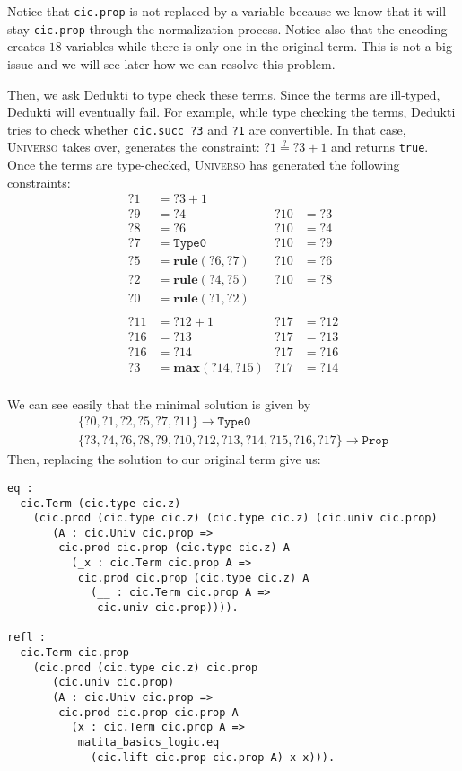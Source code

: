 \documentclass[conference]{IEEEtran}
\newcommand{\universo}{\textsc{Universo}}
\begin{document}
Notice that \texttt{cic.prop} is not replaced by a variable because we know that it will stay \texttt{cic.prop} through the normalization process. Notice also that the encoding creates \(18\) variables while there is only one in the original term. This is not a big issue and we will see later how we can resolve this problem.

Then, we ask Dedukti to type check these terms. Since the terms are ill-typed, Dedukti will eventually fail. For example, while type checking the terms, Dedukti tries to check whether \texttt{cic.succ ?3} and \texttt{?1} are convertible. In that case, \universo{} takes over, generates the constraint: \(?1 \stackrel{?}{=} ?3 + 1\) and returns \texttt{true}. Once the terms are type-checked, \universo{} has generated the following constraints:
\begin{align*}
  ?1 &= ?3 + 1 \\
  ?9 &= ?4     & ?10 &= ?3\\
  ?8 &= ?6     & ?10 &= ?4\\
  ?7 &= \mathtt{Type0} & ?10 &= ?9\\
  ?5 &= \mathbf{rule}(?6,?7)     & ?10 &= ?6\\
  ?2 &= \mathbf{rule}(?4,?5)     & ?10 &= ?8\\
  ?0 &= \mathbf{rule}(?1,?2)\\
  \\
  ?11 &= ?12 + 1 & ?17 &= ?12\\
  ?16 &= ?13 & ?17 &= ?13\\
  ?16 &= ?14 & ?17 &= ?16\\
  ?3 &= \mathbf{max}(?14,?15) & ?17 &= ?14\\
\end{align*}

We can see easily that the minimal solution is given by
\begin{align*}
  \{?0,?1,?2,?5,?7,?11\} \to \mathtt{Type0}\\
  \{?3,?4,?6,?8,?9,?10,?12, ?13, ?14, ?15, ?16, ?17\} \to \mathtt{Prop}
\end{align*}
Then, replacing the solution to our original term give us:

\begin{verbatim}
eq :
  cic.Term (cic.type cic.z)
    (cic.prod (cic.type cic.z) (cic.type cic.z) (cic.univ cic.prop)
       (A : cic.Univ cic.prop =>
        cic.prod cic.prop (cic.type cic.z) A
          (_x : cic.Term cic.prop A =>
           cic.prod cic.prop (cic.type cic.z) A
             (__ : cic.Term cic.prop A =>
              cic.univ cic.prop)))).

refl :
  cic.Term cic.prop
    (cic.prod (cic.type cic.z) cic.prop
       (cic.univ cic.prop)
       (A : cic.Univ cic.prop =>
        cic.prod cic.prop cic.prop A
          (x : cic.Term cic.prop A =>
           matita_basics_logic.eq
             (cic.lift cic.prop cic.prop A) x x))).
\end{verbatim}
\end{document}
